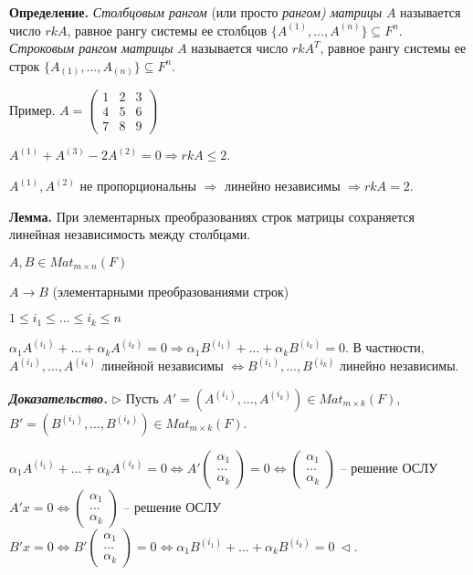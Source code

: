 \bigskip
\textbf{Определение.} \textit{Столбцовым рангом} (или просто \textit{рангом) матрицы} $A$ называется число $rkA$, равное рангу системы ее столбцов $\{A^{(1)}, \dots, A^{(n)}\} \subseteq F^n$. \textit{Строковым рангом матрицы} $A$ называется число $rkA^T$, равное рангу системы ее строк $\{A_{(1)}, \dots, A_{(n)}\} \subseteq F^n$.

\bigskip
Пример. $A = \begin{pmatrix} 1 & 2 & 3 \\ 4 & 5 & 6 \\ 7 & 8 & 9 \end{pmatrix}$

$A^{(1)} + A^{(3)} - 2A^{(2)} = 0 \Rightarrow rkA \leq 2$.

$A^{(1)}, A^{(2)}$ не пропорциональны $\Rightarrow$ линейно независимы $\Rightarrow rkA = 2$.

\bigskip
\textbf{Лемма.} При элементарных преобразованиях строк матрицы сохраняется линейная независимость между столбцами.

$A, B \in Mat_{m \times n} (F)$ 

$A \rightarrow B$ (элементарными преобразованиями строк)

$1 \leq i_1 \leq \dots \leq i_k \leq n$

$\alpha_1 A^{(i_1)} + \dots + \alpha_k A^{(i_k)} = 0 \Rightarrow \alpha_1 B^{(i_1)} + \dots + \alpha_k B^{(i_k)} = 0$. В частности, $A^{(i_1)}, \dots, A^{(i_k)}$ линейной независимы $\Leftrightarrow B^{(i_1)}, \dots, B^{(i_k)}$ линейно независимы.

\bigskip
\textbf{\textit{Доказательство.}} $\rhd$ Пусть $A' = ( A^{(i_1)}, \dots, A^{(i_k)}) \in Mat_{m \times k} (F)$, $B' = (B^{(i_1)}, \dots, B^{(i_k)}) \in Mat_{m \times k} (F)$.

$\alpha_1 A^{(i_1)} + \dots + \alpha_k A^{(i_k)} = 0 \Leftrightarrow A' \begin{pmatrix} \alpha_1 \\ \dots \\ \alpha_k \end{pmatrix} = 0 \Leftrightarrow \begin{pmatrix} \alpha_1 \\ \dots \\ \alpha_k \end{pmatrix} $ -- решение ОСЛУ $A'x = 0 \Leftrightarrow \begin{pmatrix} \alpha_1 \\ \dots \\ \alpha_k \end{pmatrix} $ -- решение ОСЛУ $B'x = 0 \Leftrightarrow B' \begin{pmatrix} \alpha_1 \\ \dots \\ \alpha_k \end{pmatrix} = 0 \Leftrightarrow \alpha_1 B^{(i_1)} + \dots + \alpha_k B^{(i_k)} = 0 \ \lhd .$

